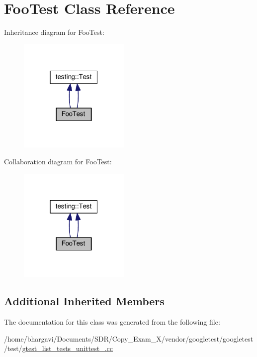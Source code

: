 \hypertarget{class_foo_test}{}\section{Foo\+Test Class Reference}
\label{class_foo_test}


Inheritance diagram for Foo\+Test\+:
\nopagebreak
\begin{figure}[H]
\begin{center}
\leavevmode
\includegraphics[width=151pt]{class_foo_test__inherit__graph}
\end{center}
\end{figure}


Collaboration diagram for Foo\+Test\+:
\nopagebreak
\begin{figure}[H]
\begin{center}
\leavevmode
\includegraphics[width=151pt]{class_foo_test__coll__graph}
\end{center}
\end{figure}
\subsection*{Additional Inherited Members}


The documentation for this class was generated from the following file\+:\begin{DoxyCompactItemize}
\item 
/home/bhargavi/\+Documents/\+S\+D\+R/\+Copy\+\_\+\+Exam\+\_\+X/vendor/googletest/googletest/test/\hyperlink{gtest__list__tests__unittest___8cc}{gtest\+\_\+list\+\_\+tests\+\_\+unittest\+\_\+.\+cc}\end{DoxyCompactItemize}
